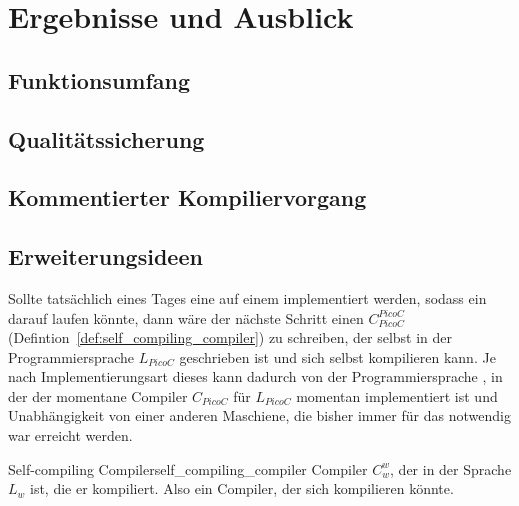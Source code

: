 \chapter{Ergebnisse und Ausblick}
\label{ch:ergebnisse_und_ausblick}


\section{Funktionsumfang}
\section{Qualitätssicherung}
\label{sec:qualitätssicherung}
\section{Kommentierter Kompiliervorgang}
\section{Erweiterungsideen}
Sollte tatsächlich eines Tages eine  auf einem  implementiert werden, sodass ein  darauf laufen könnte, dann wäre der nächste Schritt einen  $C_{PicoC}^{PicoC}$ (Defintion~\ref{def:self_compiling_compiler}) zu schreiben, der selbst in der Programmiersprache $L_{PicoC}$ geschrieben ist und sich selbst kompilieren kann. Je nach Implementierungsart dieses  kann dadurch  von der Programmiersprache , in der der momentane Compiler $C_{PicoC}$ für $L_{PicoC}$ momentan implementiert ist und Unabhängigkeit von einer anderen Maschiene, die bisher immer für das  notwendig war erreicht werden.

\begin{Definition}{Self-compiling Compiler}{self_compiling_compiler}
  Compiler $C_w^w$, der in der Sprache $L_w$  ist, die er  kompiliert. Also ein Compiler, der sich  kompilieren könnte.
\end{Definition}

